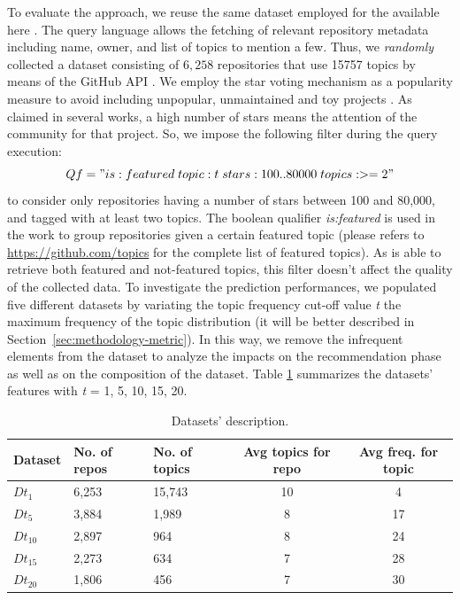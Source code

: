 To evaluate the approach, we reuse the same dataset employed for the \MNB available here \cite{MNBreplication}. The \GH query language \cite{understanding} allows the fetching of relevant repository metadata including name, owner, and list of topics to mention a few. Thus, we \emph{randomly} collected a dataset consisting of $6,258$ repositories that use 15757 topics by means of the GitHub API \cite{pygithub/pygithub_2019}. We employ the \GH star voting mechanism as a popularity measure to avoid including unpopular, unmaintained and toy projects \cite{borges_whats_2018}. As claimed in several works\cite{borges_popularity_2017, borges_predicting_2016}, a high number of stars means the attention of the community for that project. So, we impose the following filter during the query execution:
\begin{equation}
\small
Qf = "is:featured \; topic:t \; stars:100..80000 \; topics:>=2"
\end{equation}%
to consider only \GH repositories having a number of stars between 100 and 80,000, and tagged with at least two topics. The boolean qualifier \emph{is:featured} is used in the \MNB work to group repositories given a certain featured topic (please refers to \url{https://github.com/topics} for the complete list of featured topics). As \CT is able to retrieve both featured and not-featured topics, this filter doesn't affect the quality of the collected data.
To investigate the \CT prediction performances, we populated five different datasets by variating the topic frequency cut-off value \emph{t} \ie the maximum frequency of the topic distribution (it will be better described in Section~\ref{sec:methodology-metric}). In this way, we remove the infrequent elements from the dataset to analyze the impacts on the recommendation phase as well as on the composition of the dataset. Table \ref{tab:datasets} summarizes the datasets' features with \emph{t} = 1, 5, 10, 15, 20.


\begin{table}[h]
\centering


\resizebox{8.5cm}{!} {
\begin{tabular}{|l|l|l|c|c|}
\hline
\textbf{Dataset} & \textbf{No. of repos} &\textbf{ No. of topics} & \textbf{Avg topics for repo} & \textbf{Avg freq. for topic} \\ \hline
$Dt_1$  &       6,253       &    15,743       &  10  &  4         \\ \hline
 $Dt_5$  &        3,884      &    1,989       &     8  &   17   \\ \hline
$Dt_{10}$  &    2,897          &      964	     &   8    &  24 \\ \hline
$Dt_{15}$  &    2,273         &   634        &   7 &  28       \\ \hline
$Dt_{20}$  &    1,806        &   456        &   7 &  30       \\ \hline

\end{tabular}
}
\caption{Datasets' description.}
\label{tab:datasets}
\end{table} 

